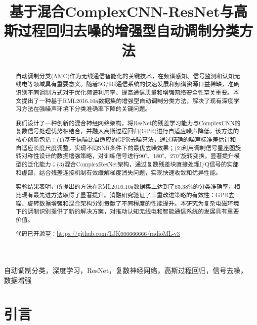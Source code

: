 \documentclass[conference]{IEEEtran}
\begin{document}
\title{基于混合ComplexCNN-ResNet与高斯过程回归去噪的增强型自动调制分类方法}

\author{
}

\maketitle

\begin{abstract}
自动调制分类(AMC)作为无线通信智能化的关键技术，在频谱感知、信号监测和认知无线电等领域具有重要意义。随着5G/6G通信系统的快速发展和频谱资源日益稀缺，准确识别不同调制方式对于优化频谱利用率、提高通信质量和增强网络安全性至关重要。本文提出了一种基于RML2016.10a数据集的增强型自动调制分类方法，解决了现有深度学习方法在强噪声环境下分类准确率下降的关键问题。

我们设计了一种创新的混合神经网络架构，将ResNet的残差学习能力与ComplexCNN的复数信号处理优势相结合，并融入高斯过程回归(GPR)进行自适应噪声降低。该方法的核心创新包括：(1)基于信噪比自适应的GPR去噪算法，通过精确的噪声标准差估计和自适应长度尺度调整，实现不同SNR条件下的最优去噪效果；(2)利用调制信号星座图旋转对称性设计的数据增强策略，对训练信号进行90°、180°、270°旋转变换，显著提升模型的泛化能力；(3)混合ComplexResNet架构，通过复数残差块直接处理I/Q信号的实部和虚部，结合残差连接机制有效缓解梯度消失问题，实现快速收敛和优异性能。

实验结果表明，所提出的方法在RML2016.10a数据集上达到了65.38\%的分类准确率，相比现有最先进方法取得了显著提升。消融研究验证了三重改进策略的有效性：GPR去噪、旋转数据增强和混合架构分别贡献了不同程度的性能提升。本研究为复杂电磁环境下的调制识别提供了新的解决方案，对推动认知无线电和智能通信系统的发展具有重要价值。

代码已开源至：\url{https://github.com/LJK666666666/radioML-v3}
\end{abstract}

\begin{IEEEkeywords}
自动调制分类，深度学习，ResNet，复数神经网络，高斯过程回归，信号去噪，数据增强
\end{IEEEkeywords}

\section{引言}
\end{document}
